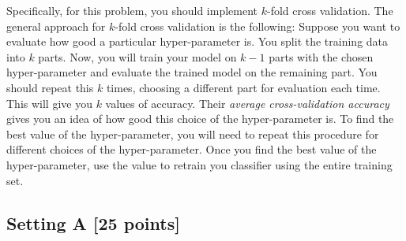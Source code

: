 Specifically, for this problem, you should implement $k$-fold cross
validation. The general approach for $k$-fold cross validation is the
following: Suppose you want to evaluate how good a particular
hyper-parameter is. You split the training data into $k$ parts. Now,
you will train your model on $k-1$ parts with the chosen
hyper-parameter and evaluate the trained model on the remaining part.
You should repeat this $k$ times, choosing a different part for
evaluation each time. This will give you $k$ values of accuracy. Their
{\em average cross-validation accuracy} gives you an idea of how good
this choice of the hyper-parameter is. To find the best value of the
hyper-parameter, you will need to repeat this procedure for different
choices of the hyper-parameter. Once you find the best value of the
hyper-parameter, use the value to retrain you classifier using the
entire training set.

\subsection*{Setting A [25 points]}


